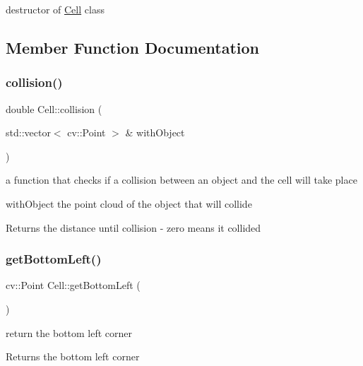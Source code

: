 destructor of \mbox{\hyperlink{class_cell}{Cell}} class 

\subsection{Member Function Documentation}
\mbox{\label{class_cell_acc1faa0802609404e8058263004087ea}} 
\subsubsection{\texorpdfstring{collision()}{collision()}}
{\footnotesize\ttfamily double Cell\+::collision (\begin{DoxyParamCaption}\item[{std\+::vector$<$ cv\+::\+Point $>$ \&}]{with\+Object }\end{DoxyParamCaption})}



a function that checks if a collision between an object and the cell will take place 

\begin{DoxyItemize}
\item with\+Object the point cloud of the object that will collide \begin{DoxyReturn}{Returns}
the distance until collision -\/ zero means it collided 
\end{DoxyReturn}
\end{DoxyItemize}
\mbox{\label{class_cell_a1946142c5e112176e1cd20cc6d07f831}} 
\subsubsection{\texorpdfstring{get\+Bottom\+Left()}{getBottomLeft()}}
{\footnotesize\ttfamily cv\+::\+Point Cell\+::get\+Bottom\+Left (\begin{DoxyParamCaption}{ }\end{DoxyParamCaption})}

return the bottom left corner \begin{DoxyReturn}{Returns}
the bottom left corner 
\end{DoxyReturn}
\mbox{\label{class_cell_afa1704102095fd55ac036f7d290eed05}} 
